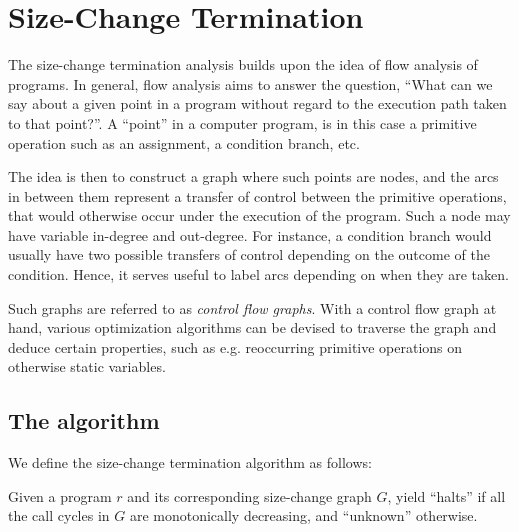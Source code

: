 \chapter{Size-Change Termination}\label{section:size-change-termination}

The size-change termination analysis builds upon the idea of flow analysis of
programs. In general, flow analysis aims to answer the question, ``What can we
say about a given point in a program without regard to the execution path taken
to that point?''. A ``point'' in a computer program, is in this case a primitive
operation such as an assignment, a condition branch, etc.

The idea is then to construct a graph where such points are nodes, and the arcs
in between them represent a transfer of control between the primitive
operations, that would otherwise occur under the execution of the program.
Such a node may have variable in-degree and out-degree. For instance, a
condition branch would usually have two possible transfers of control depending
on the outcome of the condition. Hence, it serves useful to label arcs
depending on when they are taken.

Such graphs are referred to as \emph{control flow graphs}. With a control flow
graph at hand, various optimization algorithms can be devised to traverse the
graph and deduce certain properties, such as e.g.  reoccurring primitive
operations on otherwise static variables\cite{kildall}.





\section{The algorithm}

We define the size-change termination algorithm as follows:

\begin{definition}\label{definition:size-change-algorithm} Given a program $r$
and its corresponding size-change graph $G$, yield ``halts'' if all the call
cycles in $G$ are monotonically decreasing, and ``unknown''
otherwise.\end{definition}
